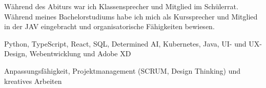 \documentclass[9pt]{developercv} %
\begin{document}

\vspace{0.5cm}

\begin{minipage}[t]{0.45\textwidth}
	\vspace{-\baselineskip} %


	Während des Abiturs war ich Klassensprecher und Mitglied im Schülerrat. Während meines Bachelorstudiums habe ich mich als Kurssprecher und Mitglied in der JAV eingebracht und organisatorische Fähigkeiten bewiesen.
\end{minipage}\hfill
\begin{minipage}[t]{0.45\textwidth}
	\vspace{-\baselineskip} %


	Python, TypeScript, React, SQL, Determined AI, Kubernetes, Java, UI- und UX-Design, Webentwicklung und Adobe XD

    \vspace{0.2cm}

    Anpassungsfähigkeit, Projektmanagement (SCRUM, Design Thinking) und kreatives Arbeiten
\end{minipage}


\end{document}
